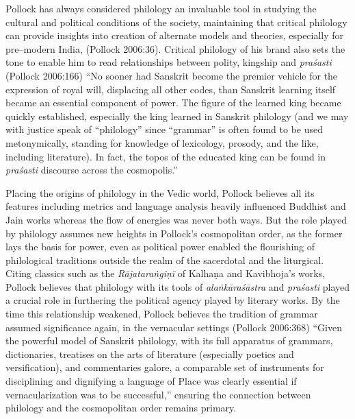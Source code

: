 Pollock has always considered philology an invaluable tool in studying the cultural and political conditions of the society, maintaining that critical philology can provide insights into creation of alternate models and theories, especially for pre–modern India, (Pollock 2006:36). Critical philology of his brand also sets the tone to enable him to read relationships between polity, kingship and \textit{praśasti} (Pollock 2006:166) “No sooner had Sanskrit become the premier vehicle for the expression of royal will, displacing all other codes, than Sanskrit learning itself became an essential component of power. The figure of the learned king became quickly established, especially the king learned in Sanskrit philology (and we may with justice speak of “philology” since “grammar” is often found to be used metonymically, standing for knowledge of lexicology, prosody, and the like, including literature). In fact, the topos of the educated king can be found in \textit{praśasti} discourse across the cosmopolis.”

Placing the origins of philology in the Vedic world, Pollock believes all its features including metrics and language analysis heavily influenced Buddhist and Jain works whereas the flow of energies was never both ways. But the role played by philology assumes new heights in Pollock’s cosmopolitan order, as the former lays the basis for power, even as political power enabled the flourishing of philological traditions outside the realm of the sacerdotal and the liturgical. Citing classics such as the \textit{Rājataraṅgiṇī} of Kalhaṇa and Kavibhoja’s works, Pollock believes that philology with its tools of \textit{alaṅkāraśāstra} and \textit{praśasti} played a crucial role in furthering the political agency played by literary works. By the time this relationship weakened, Pollock believes the tradition of grammar assumed significance again, in the vernacular settings (Pollock 2006:368) “Given the powerful model of Sanskrit philology, with its full apparatus of grammars, dictionaries, treatises on the arts of literature (especially poetics and versification), and commentaries galore, a comparable set of instruments for disciplining and dignifying a language of Place was clearly essential if vernacularization was to be successful,” ensuring the connection between philology and the cosmopolitan order remains primary.



